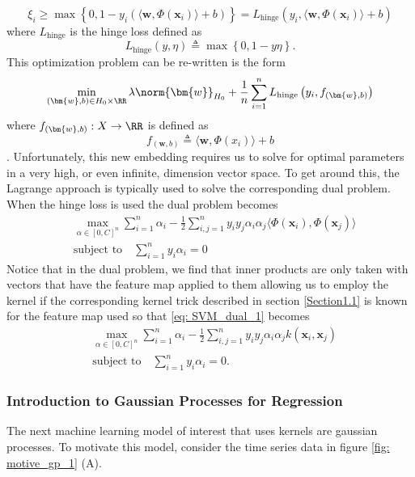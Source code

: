 \[
    \xi_i \geq \max \left\{ 0, 1 - y_i \left( \langle \bm{w} , \Phi \left( \bm{x}_i \right) \rangle + b \right)  \right\} = L_{\text{hinge}} \left( y_i , \langle \bm{w} , \Phi \left( \bm{x}_i \right) \rangle + b \right)
\]
where $L_{\text{hinge}}$ is the hinge loss defined as
\[
    L_{\text{hinge}} \left( y,\eta \right) \triangleq \max \left\{ 0,1-y\eta \right\}.
\]
This optimization problem can be re-written is the form
\[
    \min_{\left( \bm{w} , b \right) \in H_0 \times \RR} \lambda \norm{\bm{w}}_{H_0} + \frac{1}{n} \sum_{i=1}^{n} L_{\text{hinge}} \left( y_i , f_{\left( \bm{w} , b \right)} \right)
\]
where $f_{\left( \bm{w} , b \right)} : X \to \RR$ is defined as
\[
    f_{\left( \bm{w} , b \right)} \triangleq \langle \bm{w} , \Phi \left( x_i \right) \rangle + b
\]
\cite{SteinwartIngo2008SVMb}. Unfortunately, this new embedding requires us to solve for optimal parameters in a very high, or even infinite, dimension vector space. To get around this, the Lagrange approach is typically used to solve the corresponding dual problem. When the hinge loss is used the dual problem becomes
\begin{align} \label{eq: SVM_dual_1}
     & \max_{\alpha \in \left[ 0,C \right]^n} \sum_{i=1}^{n} \alpha_i - \frac{1}{2} \sum_{i,j=1}^{n} y_i y_j \alpha_i \alpha_j \langle \Phi \left( \bm{x}_i \right), \Phi \left( \bm{x}_j \right) \rangle \nonumber \\
     & \text{subject to} \quad \sum_{i=1}^{n} y_i \alpha_i = 0
\end{align}
Notice that in the dual problem, we find that inner products are only taken with vectors that have the feature map applied to them allowing us to employ the kernel if the corresponding kernel trick described in section \ref{Section1.1} is known for the feature map used so that \ref{eq: SVM_dual_1} becomes
\begin{align*}
     & \max_{\alpha \in \left[ 0,C \right]^n} \sum_{i=1}^{n} \alpha_i - \frac{1}{2} \sum_{i,j=1}^{n} y_i y_j \alpha_i \alpha_j k \left( \bm{x}_i, \bm{x}_j \right) \\
     & \text{subject to} \quad \sum_{i=1}^{n} y_i \alpha_i = 0.
\end{align*}

\subsubsection{Introduction to Gaussian Processes for Regression}\label{Section1.4.2}
The next machine learning model of interest that uses kernels are gaussian processes. To motivate this model, consider the time series data in figure \ref{fig: motive_gp_1} (A).

